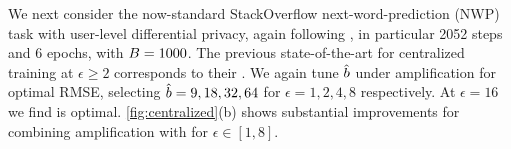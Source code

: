 \documentclass{article}
\begin{document}




We next consider the now-standard StackOverflow next-word-prediction (NWP) task with user-level differential privacy, again  following  \cite{choquette2022multi}, in particular 2052 steps and 6 epochs, with $B=1000$. The previous state-of-the-art for centralized training at $\epsilon \ge 2$ corresponds to their \memf. We again tune $\hat{b}$ under amplification for optimal RMSE, selecting  $\hat{b} =  9, 18, 32, 64$ for $\epsilon = 1, 2, 4, 8$ respectively. At $\epsilon=16$ we find \memf is optimal. \cref{fig:centralized}(b) shows substantial improvements for combining amplification with \MF for $\epsilon \in [1, 8]$.


\end{document}
